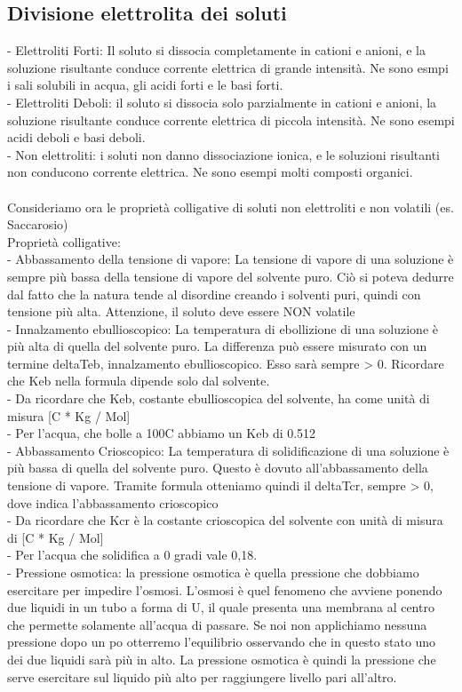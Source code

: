 \subsection{Divisione elettrolita dei soluti}
\tab- Elettroliti Forti: Il soluto si dissocia completamente in cationi e anioni, e la soluzione risultante conduce corrente elettrica di grande intensità. Ne sono esmpi i sali solubili in acqua, gli acidi forti e le basi forti.\\
\tab- Elettroliti Deboli: il soluto si dissocia solo parzialmente in cationi e anioni, la soluzione risultante conduce corrente elettrica di piccola intensità. Ne sono esempi acidi deboli e basi deboli. \\
\tab- Non elettroliti: i soluti non danno dissociazione ionica, e le soluzioni risultanti non conducono corrente elettrica. Ne sono esempi molti composti organici.  \\\\
Consideriamo ora le proprietà colligative di soluti non elettroliti e non volatili (es. Saccarosio)\\
Proprietà colligative:\\
\tab- Abbassamento della tensione di vapore: La tensione di vapore di una soluzione è sempre più bassa della tensione di vapore del solvente puro. Ciò si poteva dedurre dal fatto che la natura tende al disordine creando i solventi puri, quindi con tensione più alta. Attenzione, il soluto deve essere NON volatile\\
\tab- Innalzamento ebullioscopico: La  temperatura di ebollizione di una soluzione è più alta di quella del solvente puro. La differenza può essere misurato con un termine deltaTeb, innalzamento ebullioscopico. Esso sarà sempre > 0. Ricordare che Keb nella formula dipende solo dal solvente. \\
\tab\tab- Da ricordare che Keb, costante ebullioscopica del solvente, ha come unità di misura [C * Kg / Mol]\\
\tab\tab- Per l’acqua, che bolle a 100C abbiamo un Keb di 0.512\\
\tab- Abbassamento Crioscopico: La temperatura di solidificazione di una soluzione è più bassa di quella del solvente puro. Questo è dovuto all’abbassamento della tensione di vapore. Tramite formula otteniamo quindi il deltaTcr, sempre > 0, dove indica l’abbassamento crioscopico\\
\tab\tab- Da ricordare che Kcr è la costante crioscopica del solvente con unità di misura di [C * Kg / Mol]\\
\tab\tab- Per l’acqua che solidifica a 0 gradi vale 0,18.\\
\tab- Pressione osmotica: la pressione osmotica è quella pressione che dobbiamo esercitare per impedire l’osmosi. L’osmosi è quel fenomeno che avviene ponendo due liquidi in un tubo a forma di U, il quale presenta una membrana al centro che permette solamente all’acqua di passare. Se noi non applichiamo nessuna pressione dopo un po otterremo l’equilibrio osservando che in questo stato uno dei due liquidi sarà più in alto. La pressione osmotica è quindi la pressione che serve esercitare sul liquido più alto per raggiungere livello pari all’altro.
